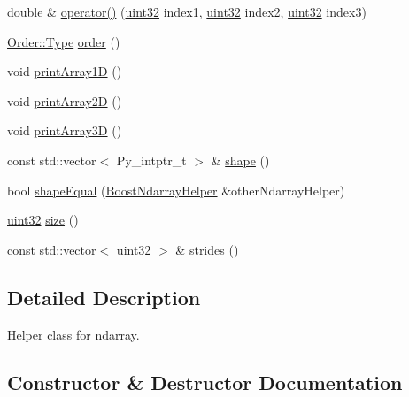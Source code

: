 \begin{DoxyCompactItemize}
double \& \mbox{\hyperlink{class_num_cpp_1_1_boost_ndarray_helper_a36d01c4c05352236735b0f9599bf9fb2}{operator()}} (\mbox{\hyperlink{namespace_num_cpp_a36f388e948380413c63011cab9b7fbd5}{uint32}} index1, \mbox{\hyperlink{namespace_num_cpp_a36f388e948380413c63011cab9b7fbd5}{uint32}} index2, \mbox{\hyperlink{namespace_num_cpp_a36f388e948380413c63011cab9b7fbd5}{uint32}} index3)
\item 
\mbox{\hyperlink{struct_num_cpp_1_1_order_a1ec7189cd22800f34d163dec75732c7f}{Order\+::\+Type}} \mbox{\hyperlink{class_num_cpp_1_1_boost_ndarray_helper_a5235f3230a1baee3e8e9b1184ef10238}{order}} ()
\item 
void \mbox{\hyperlink{class_num_cpp_1_1_boost_ndarray_helper_a80575e5d0dcdb4c9f7448c8f08b463b2}{print\+Array1D}} ()
\item 
void \mbox{\hyperlink{class_num_cpp_1_1_boost_ndarray_helper_ab2699f035965b1fc1b40c1186526dad0}{print\+Array2D}} ()
\item 
void \mbox{\hyperlink{class_num_cpp_1_1_boost_ndarray_helper_a4254a64f9aa17d65262a563f1a04b1db}{print\+Array3D}} ()
\item 
const std\+::vector$<$ Py\+\_\+intptr\+\_\+t $>$ \& \mbox{\hyperlink{class_num_cpp_1_1_boost_ndarray_helper_a91fbd5b18e549b43baf78c07d9617c8c}{shape}} ()
\item 
bool \mbox{\hyperlink{class_num_cpp_1_1_boost_ndarray_helper_a5e2e1e62abd9da95a83d2539fd94fa30}{shape\+Equal}} (\mbox{\hyperlink{class_num_cpp_1_1_boost_ndarray_helper}{Boost\+Ndarray\+Helper}} \&other\+Ndarray\+Helper)
\item 
\mbox{\hyperlink{namespace_num_cpp_a36f388e948380413c63011cab9b7fbd5}{uint32}} \mbox{\hyperlink{class_num_cpp_1_1_boost_ndarray_helper_ac61d43462f27d53f0265e16894e2c9b9}{size}} ()
\item 
const std\+::vector$<$ \mbox{\hyperlink{namespace_num_cpp_a36f388e948380413c63011cab9b7fbd5}{uint32}} $>$ \& \mbox{\hyperlink{class_num_cpp_1_1_boost_ndarray_helper_a2ba8bec864ae6ee599a553a00352ba5c}{strides}} ()
\end{DoxyCompactItemize}


\subsection{Detailed Description}
Helper class for ndarray. 

\subsection{Constructor \& Destructor Documentation}
\mbox{\label{class_num_cpp_1_1_boost_ndarray_helper_ab19508d6f9bc79d031152eb2640df6ac}} 

